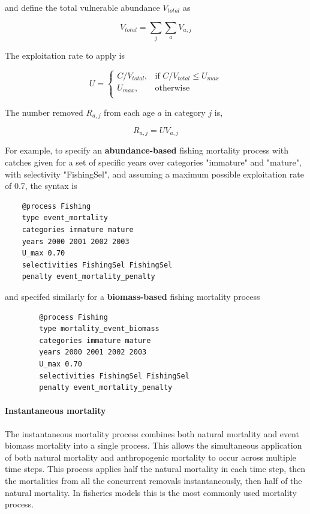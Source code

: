 and define the total vulnerable abundance $V_{total}$ as

\begin{equation}
  V_{total}  = \sum\limits_j {\sum\limits_a {V_{a,j}}}
\end{equation}

The exploitation rate to apply is

\begin{equation}
U = \begin{cases}
  C/V_{total}, & \text{if $C/V_{total} \leq U_{max}$} \\
  U_{max}, & \text{otherwise}\\
  \end{cases}
\end{equation}

The number removed $R_{a,j}$ from each age $a$ in category $j$ is,

\begin{equation}
  R_{a,j} = U V_{a,j}
\end{equation}

For example, to specify an \textbf{abundance-based} fishing mortality process with catches given for a set of specific years over categories "immature" and "mature", with selectivity "FishingSel", and assuming a maximum possible exploitation rate of 0.7, the syntax is

{\small{\begin{verbatim}
	@process Fishing
	type event_mortality
	categories immature mature
	years 2000 2001 2002 2003
	U_max 0.70
	selectivities FishingSel FishingSel
	penalty event_mortality_penalty
	\end{verbatim}}}

and specifed similarly for a \textbf{biomass-based} fishing mortality process

{\small{\begin{verbatim}
		@process Fishing
		type mortality_event_biomass
		categories immature mature
		years 2000 2001 2002 2003
		U_max 0.70
		selectivities FishingSel FishingSel
		penalty event_mortality_penalty
		\end{verbatim}}}

\paragraph{Instantaneous mortality}\label{subsubsec:instantaneous-mortality}

The instantaneous mortality process combines both natural mortality and event biomass mortality into a single process. This allows the simultaneous application of both natural mortality and anthropogenic mortality to occur across multiple time steps. This process applies half the natural mortality in each time step, then the mortalities from all the concurrent removals instantaneously, then half of the natural mortality. In fisheries models this is the most commonly used mortality process.

